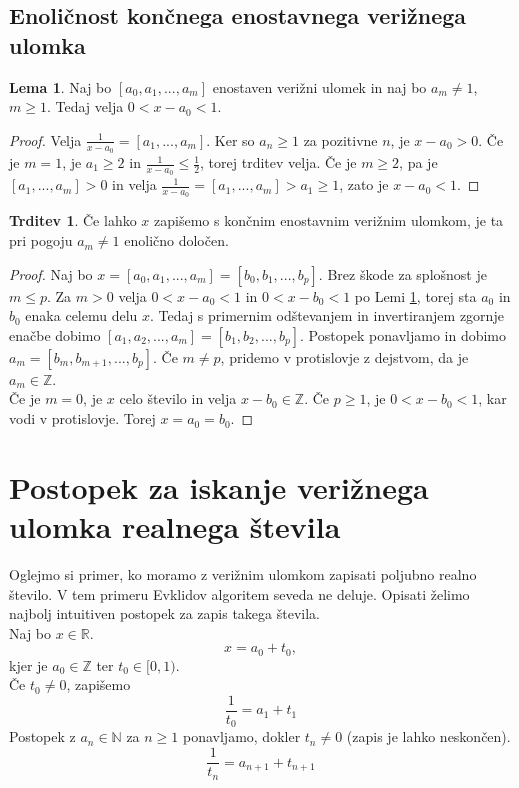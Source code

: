 \documentclass[a4paper,12pt]{article}
\newcommand{\N}{\mathbb{N}}
\newcommand{\R}{\mathbb{R}}
\newcommand{\Z}{\mathbb{Z}}
\theoremstyle{definition}
\theoremstyle{proposition}
\newtheorem{trd}{Trditev}[section]
\theoremstyle{theorem}
\theoremstyle{lemma}
\newtheorem{lem}{Lema}[section]
\begin{document}
\subsection{Enoličnost končnega enostavnega verižnega ulomka} \label{enolicnost}

\begin{lem}
\label{celidel}
Naj bo $[a_0, a_1, ..., a_m]$ enostaven verižni ulomek in naj bo $a_m \neq 1$, $m \geq 1$. Tedaj velja $0<x-a_0<1$.
\end{lem}
\begin{proof}
Velja $\frac{1}{x-a_0} = [a_1, ..., a_m]$. Ker so $a_n \geq 1$ za pozitivne $n$, je $x-a_0 > 0$. Če je $m=1$, je $a_1 \geq 2$ in $\frac{1}{x-a_0} \leq \frac{1}{2}$, torej trditev velja. Če je $m\geq2$, pa je $ [a_1, ..., a_m] > 0$ in velja $\frac{1}{x-a_0} = [a_1, ..., a_m] > a_1 \geq1$, zato je $x-a_0<1$.
\end{proof}

\begin{trd}
\label{enolicnost}
Če lahko $x$ zapišemo s končnim enostavnim verižnim ulomkom, je ta pri pogoju $a_m \neq 1$ enolično določen.
\end{trd}
\begin{proof}
Naj bo $x=[a_0, a_1, ..., a_m]=[b_0, b_1, ..., b_p]$. Brez škode za splošnost je $m\leq p$. Za $m>0$ velja $0<x-a_0<1$ in $0<x-b_0<1$ po Lemi \ref{celidel}, torej sta $a_0$ in $b_0$ enaka celemu delu $x$. Tedaj s primernim odštevanjem in invertiranjem zgornje enačbe dobimo $[a_1, a_2, ..., a_m]=[b_1, b_2, ..., b_p]$. Postopek ponavljamo in dobimo $a_m =[b_m, b_{m+1}, ..., b_p]$. Če $m \neq p$, pridemo v protislovje z dejstvom, da je $a_m \in \Z$. \\
Če je $m=0$, je $x$ celo število in velja $x-b_0 \in \Z$. Če $p\geq1$, je $0<x-b_0<1$, kar vodi v protislovje. Torej $x=a_0=b_0$. 
\end{proof}

\section{Postopek za iskanje verižnega ulomka realnega števila} \label{realna}

Oglejmo si primer, ko moramo z verižnim ulomkom zapisati poljubno realno število. V tem primeru Evklidov algoritem seveda ne deluje. Opisati želimo najbolj intuitiven postopek za zapis takega števila.\\
\vspace{5mm}
Naj bo $x \in \R$.
\[ x = a_0+t_0, \]
kjer je $a_0 \in \Z$ ter $t_0 \in [0,1)$.\\
Če $t_0 \neq 0$, zapišemo \[ \frac{1}{t_0} = a_1 + t_1 \]
Postopek z $a_n \in \N$ za $n \geq 1$ ponavljamo, dokler $t_n \neq 0$ (zapis je lahko neskončen).
\[ \frac{1}{t_n} = a_{n+1}+t_{n+1} \] \vspace{5mm}
\end{document}
